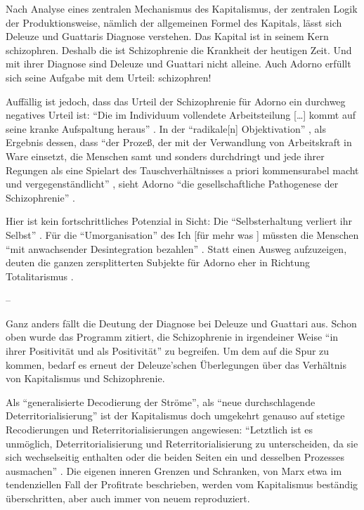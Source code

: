 \documentclass[12pt,
               DIV13,
               paper=a4,
               twoside=false,
               onehalfspacing,
               bibliography=totoc,
               toc=graduated,
               draft,
               ]{scrartcl}
\newcommand{\lips}{\dots\unkern}
\newcommand{\pc}[2]{\parencite[#1]{#2}}
\newcommand{\vgl}[2]{\parencite[vgl.][#1]{#2}}
\newcommand{\worries}[1]{\ifdraft{\textcolor{blue}{\texttt{(#1)}}}{}}
\newcommand{\dg}{Deleuze und Guattari\xspace}
\begin{document}
Nach Analyse eines zentralen Mechanismus des Kapitalismus, der
zentralen Logik der Produktionsweise, nämlich der allgemeinen Formel
des Kapitals, lässt sich Deleuze und Guattaris Diagnose verstehen. Das
Kapital ist in seinem Kern schizophren. Deshalb die ist Schizophrenie
die Krankheit der heutigen Zeit. Und mit ihrer Diagnose sind \dg nicht
alleine. Auch Adorno erfüllt sich seine Aufgabe mit dem Urteil:
schizophren!

Auffällig ist jedoch, dass das Urteil der Schizophrenie für Adorno ein
durchweg negatives Urteil ist: "`Die im Individuum vollendete
Arbeitsteilung [\lips] kommt auf seine kranke Aufspaltung heraus"'
\pc{263}{min}. In der "`radikale[n] Objektivation"' \pc{263}{min}, als
Ergebnis dessen, dass "`der Prozeß, der mit der Verwandlung von
Arbeitskraft in Ware einsetzt, die Menschen samt und sonders
durchdringt und jede ihrer Regungen als eine Spielart des
Tauschverhältnisses a priori kommensurabel macht und
vergegenständlicht"' \pc{262}{min}, sieht Adorno "`die
gesellschaftliche Pathogenese der Schizophrenie"' \pc{263}{min}.

Hier ist kein fortschrittliches Potenzial in Sicht: Die
"`Selbsterhaltung verliert ihr Selbst"' \pc{263}{min}. Für die
"`Umorganisation"' \pc{263}{min} des Ich [für mehr was \worries{?}]
müssten die Menschen "`mit anwachsender Desintegration bezahlen"'
\pc{263}{min}. Statt einen Ausweg aufzuzeigen, deuten die ganzen
zersplitterten Subjekte für Adorno eher in Richtung Totalitarismus
\vgl{263}{min}.

--

Ganz anders fällt die Deutung der Diagnose bei \dg aus.
Schon oben wurde das Programm zitiert, die Schizophrenie in
irgendeiner Weise "`in ihrer Positivität und als Positivität"'
\pc{24}{schizg} zu begreifen. Um dem auf die Spur zu kommen, bedarf es
erneut der Deleuze'schen Überlegungen über das Verhältnis von
Kapitalismus und Schizophrenie.

Als "`generalisierte Decodierung der Ströme"', als "`neue
durchschlagende Deterritorialisierung"' \pc{288}{ao} ist der
Kapitalismus doch umgekehrt genauso auf stetige Recodierungen und
Reterritorialisierungen angewiesen: "`Letztlich ist es unmöglich,
Deterritorialisierung und Reterritorialisierung zu unterscheiden, da
sie sich wechselseitig enthalten oder die beiden Seiten ein und
desselben Prozesses ausmachen"' \pc{333}{ao}. Die eigenen inneren
Grenzen und Schranken, von Marx etwa im tendenziellen Fall der
Profitrate beschrieben, werden vom Kapitalismus beständig
überschritten, aber auch immer von neuem reproduziert.
\end{document}
